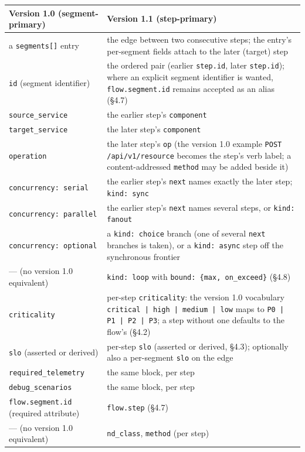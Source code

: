 \documentclass[11pt]{article}
\newcommand{\code}[1]{\texttt{#1}}
\begin{document}
\begin{center}
\footnotesize
\begin{tabular}{@{}p{4.6cm} p{11.0cm}@{}}
\toprule
\textbf{Version 1.0 (segment-primary)} & \textbf{Version 1.1 (step-primary)} \\
\midrule
a \code{segments[]} entry & the edge between two consecutive steps; the entry's per-segment fields attach to the later (target) step \\
\code{id} (segment identifier) & the ordered pair (earlier \code{step.id}, later \code{step.id}); where an explicit segment identifier is wanted, \code{flow.segment.id} remains accepted as an alias (\S4.7) \\
\code{source\_service} & the earlier step's \code{component} \\
\code{target\_service} & the later step's \code{component} \\
\code{operation} & the later step's \code{op} (the version 1.0 example \code{POST /api/v1/resource} becomes the step's verb label; a content-addressed \code{method} may be added beside it) \\
\code{concurrency: serial} & the earlier step's \code{next} names exactly the later step; \code{kind: sync} \\
\code{concurrency: parallel} & the earlier step's \code{next} names several steps, or \code{kind: fanout} \\
\code{concurrency: optional} & a \code{kind: choice} branch (one of several \code{next} branches is taken), or a \code{kind: async} step off the synchronous frontier \\
--- (no version 1.0 equivalent) & \code{kind: loop} with \code{bound: \{max, on\_exceed\}} (\S4.8) \\
\code{criticality} & per-step \code{criticality}: the version 1.0 vocabulary \code{critical | high | medium | low} maps to \code{P0 | P1 | P2 | P3}; a step without one defaults to the flow's (\S4.2) \\
\code{slo} (asserted or derived) & per-step \code{slo} (asserted or derived, \S4.3); optionally also a per-segment \code{slo} on the edge \\
\code{required\_telemetry} & the same block, per step \\
\code{debug\_scenarios} & the same block, per step \\
\code{flow.segment.id} (required attribute) & \code{flow.step} (\S4.7) \\
--- (no version 1.0 equivalent) & \code{nd\_class}, \code{method} (per step) \\

\end{tabular}
\end{center}
\end{document}
